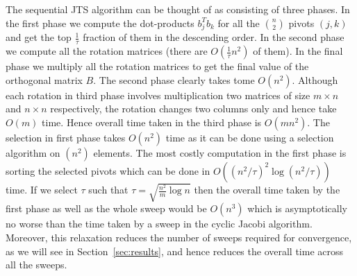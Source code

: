 \documentclass[10pt, conference, compsocconf]{IEEEtran}
\begin{document}
The sequential JTS algorithm can be thought of as consisting of three phases. In the first phase we compute the dot-products $b_j^Tb_k$ for all the ${n \choose 2}$ pivots $(j,k)$ and get the top $\frac{1}{\tau}$ fraction of them in the descending order. In the second phase we compute all the rotation matrices (there are $O(\frac{1}{\tau}n^2 )$ of them). In the final phase we multiply all the rotation matrices to get the final value of the orthogonal matrix $B$. The second phase clearly takes tome $O(n^2)$. Although each rotation in third phase involves multiplication two matrices of size $m\times n$ and $n \times n$ respectively, the rotation changes two columns only and hence take $O(m)$ time. Hence overall time taken in the third phase is $O(mn^2)$. The selection in first phase takes $O(n^2)$ time as it can be done using a selection algorithm on $(n^2)$ elements. The most costly computation in the first phase is sorting the selected pivots which can be done in $O((n^2/\tau)^2 \log{(n^2/\tau)})$ time. If we select $\tau$ such that $\tau = \sqrt{\frac{n^2}{m} \log{n}}$ then the overall time taken by the first phase as well as the whole sweep would be $O(n^3)$ which is asymptotically no worse than the time taken by a sweep in the cyclic Jacobi algorithm. Moreover, this relaxation reduces the number of sweeps required for convergence, as we will see in Section~\ref{sec:results}, and hence reduces the overall time across all the sweeps.
\end{document}
